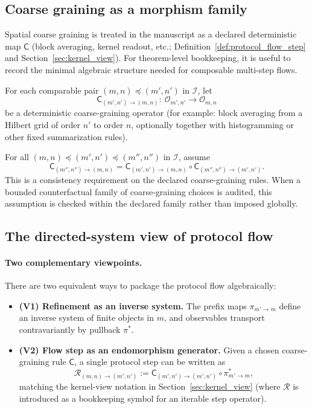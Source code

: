 \subsection{Coarse graining as a morphism family}

Spatial coarse graining is treated in the manuscript as a declared deterministic map $\mathsf{C}$ (block averaging, kernel readout, etc.; Definition~\ref{def:protocol_flow_step} and Section~\ref{sec:kernel_view}).
For theorem-level bookkeeping, it is useful to record the minimal algebraic structure needed for composable multi-step flows.

\begin{definition}\label{def:coarse_graining_operators}
\MathTag For each comparable pair $(m,n)\preceq(m',n')$ in $\mathcal{I}$, let
\[
\mathsf{C}_{(m',n')\to(m,n)}:\ \mathcal{O}_{m',n'}\to \mathcal{O}_{m,n}
\]
be a deterministic coarse-graining operator (for example: block averaging from a Hilbert grid of order $n'$ to order $n$, optionally together with histogramming or other fixed summarization rules).
\end{definition}

\begin{assumption}\label{ass:coarse_graining_composable}
\AuditTag For all $(m,n)\preceq(m',n')\preceq(m'',n'')$ in $\mathcal{I}$, assume
\[
\mathsf{C}_{(m'',n'')\to(m,n)}=
\mathsf{C}_{(m',n')\to(m,n)}\circ \mathsf{C}_{(m'',n'')\to(m',n')}.
\]
This is a consistency requirement on the declared coarse-graining rules.
When a bounded counterfactual family of coarse-graining choices is audited, this assumption is checked within the declared family rather than imposed globally.
\end{assumption}

\subsection{The directed-system view of protocol flow}

\paragraph{Two complementary viewpoints.}
There are two equivalent ways to package the protocol flow algebraically:
\begin{itemize}
\item \textbf{(V1) Refinement as an inverse system.}
The prefix maps $\pi_{m'\to m}$ define an inverse system of finite objects in $m$, and observables transport contravariantly by pullback $\pi^\ast$.
\item \textbf{(V2) Flow step as an endomorphism generator.}
Given a chosen coarse-graining rule $\mathsf{C}$, a single protocol step can be written as
\[
\mathcal{R}_{(m,n)\to(m',n')}:=
\mathsf{C}_{(m',n')\to(m',n')}\circ \pi_{m'\to m}^\ast,
\]
matching the kernel-view notation in Section~\ref{sec:kernel_view} (where $\mathcal{R}$ is introduced as a bookkeeping symbol for an iterable step operator).
\end{itemize}

